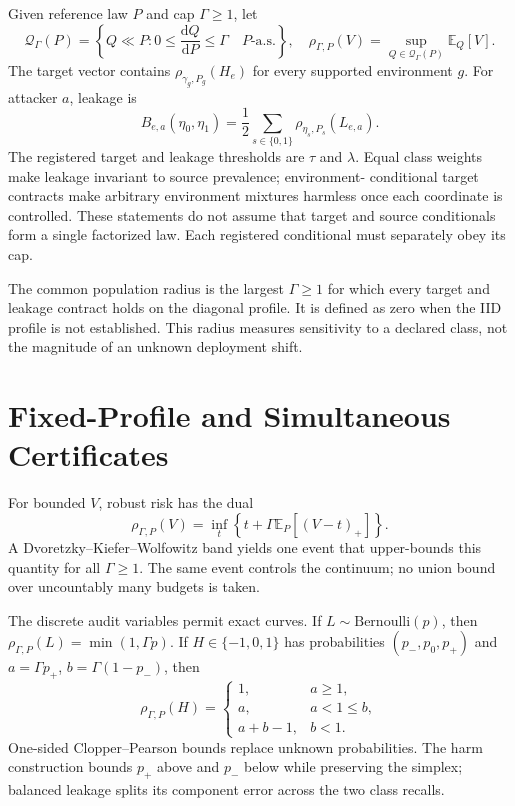 Given reference law $P$ and cap $\Gamma\ge1$, let
\begin{equation}
\mathcal Q_\Gamma(P)=\left\{Q\ll P:
0\le\frac{\mathrm dQ}{\mathrm dP}\le\Gamma\quad P\text{-a.s.}\right\},
\quad
\rho_{\Gamma,P}(V)=\sup_{Q\in\mathcal Q_\Gamma(P)}\mathbb E_Q[V].
\label{neurips:eq:ambiguity}
\end{equation}
The target vector contains
$\rho_{\gamma_g,P_g}(H_e)$ for every supported environment $g$. For attacker
$a$, leakage is
\begin{equation}
B_{e,a}(\eta_0,\eta_1)=\frac12\sum_{s\in\{0,1\}}
\rho_{\eta_s,P_s}(L_{e,a}).
\label{neurips:eq:leakage}
\end{equation}
The registered target and leakage thresholds are $\tau$ and $\lambda$.
Equal class weights make leakage invariant to source prevalence; environment-
conditional target contracts make arbitrary environment mixtures harmless once
each coordinate is controlled. These statements do not assume that target and
source conditionals form a single factorized law. Each registered conditional
must separately obey its cap.

The common population radius is the largest $\Gamma\ge1$ for which every target
and leakage contract holds on the diagonal profile. It is defined as zero when
the IID profile is not established. This radius measures sensitivity to a
declared class, not the magnitude of an unknown deployment shift.

\section{Fixed-Profile and Simultaneous Certificates}
\label{neurips:sec:certificate}

For bounded $V$, robust risk has the dual
\begin{equation}
\rho_{\Gamma,P}(V)=\inf_t\left\{t+
\Gamma\mathbb E_P[(V-t)_+]\right\}.
\label{neurips:eq:cvar}
\end{equation}
A Dvoretzky--Kiefer--Wolfowitz band yields one event that upper-bounds this
quantity for all $\Gamma\ge1$. The same event controls the continuum; no union
bound over uncountably many budgets is taken.

The discrete audit variables permit exact curves. If $L\sim\mathrm{Bernoulli}(p)$,
then $\rho_{\Gamma,P}(L)=\min(1,\Gamma p)$. If
$H\in\{-1,0,1\}$ has probabilities $(p_-,p_0,p_+)$ and
$a=\Gamma p_+$, $b=\Gamma(1-p_-)$, then
\begin{equation}
\rho_{\Gamma,P}(H)=
\begin{cases}
1,&a\ge1,\\
a,&a<1\le b,\\
a+b-1,&b<1.
\end{cases}
\label{neurips:eq:ternary}
\end{equation}
One-sided Clopper--Pearson bounds replace unknown probabilities. The harm
construction bounds $p_+$ above and $p_-$ below while preserving the simplex;
balanced leakage splits its component error across the two class recalls.

